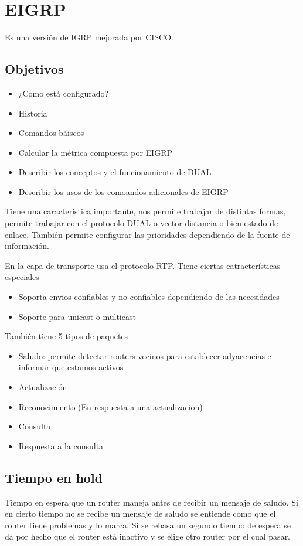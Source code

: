 \chapter{EIGRP}
Es una versión de IGRP mejorada por CISCO. 

\section{Objetivos}
\begin{itemize}
    \item ¿Como está configurado? 
    \item Historia 
    \item Comandos báiscos 
    \item Calcular la métrica compuesta por EIGRP 
    \item Describir los conceptos y el funcionamiento de DUAL 
    \item Describir los usos de los comoandos adicionales de EIGRP
\end{itemize}

Tiene una característica importante, nos permite trabajar de distintas formas, permite trabajar con el protocolo DUAL o vector distancia o bien estado de enlace. También permite configurar las prioridades dependiendo de la fuente de información. 

En la capa de transporte usa el protocolo RTP. Tiene ciertas catracterísticas especiales 
\begin{itemize}
    \item {Soporta envios confiables y no confiables dependiendo de las necesidades}
    \item {Soporte para unicast o multicast}
\end{itemize}

También tiene 5 tipos de paquetes 
\begin{itemize}
    \item Saludo: permite detectar routers vecinos para establecer adyacencias e informar que estamos activos
    \item Actualización 
    \item Reconocimiento (En respuesta a una actualizacion)
    \item Consulta 
    \item Respuesta a la consulta
\end{itemize}

\section{Tiempo en hold }
Tiempo en espera que un router maneja antes de recibir un mensaje de saludo. Si en cierto tiempo no se recibe un mensaje de saludo se entiende como que el router tiene problemas y lo marca. Si se rebasa un segundo tiempo de espera se da por hecho que el router está inactivo y se elige otro router por el cual pasar.    


